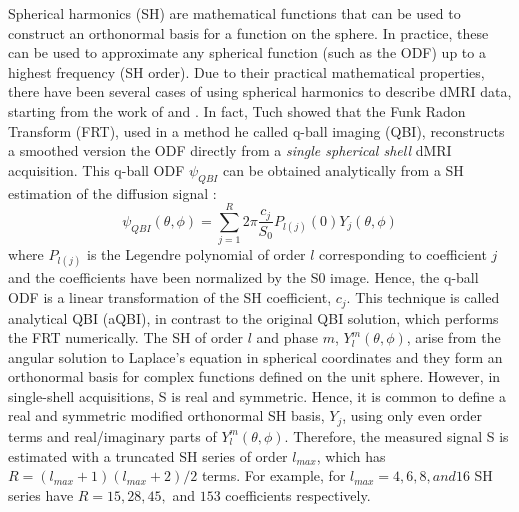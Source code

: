 \documentclass{bioinfo}
\begin{document}
Spherical harmonics (SH) are mathematical functions that can be used to construct an orthonormal basis for a function on the sphere. In practice, these can be used to approximate any spherical function (such as the ODF) up to a highest frequency (SH order). Due to their practical mathematical properties, there have been several cases of using spherical harmonics to describe dMRI data, starting from the work of \citet{Frank2001, Frank2002} and \citet{tuch-reese-etal:02}. In fact, Tuch showed that the Funk Radon Transform (FRT), used in a method he called q-ball imaging (QBI), reconstructs a smoothed version the ODF directly from a \emph{single spherical shell} dMRI acquisition. This q-ball ODF $\psi_{QBI}$ can be obtained analytically from a SH estimation of the diffusion signal \citep{descoteaux-angelino-etal:07, hess-mukherjee-etal:06, anderson:05}:
\begin{equation}\label{eq.qball}
\psi_{QBI}(\theta, \phi) = \sum_{j=1}^{R} 2\pi \frac{c_j}{S_0} P_{l(j)} (0) Y_{j} (\theta, \phi)
\end{equation}
where $P_{l(j)}$ is the Legendre polynomial of order $l$ corresponding to coefficient $j$ and the coefficients have been normalized by the S0 image. Hence, the q-ball ODF is a linear transformation of the SH coefficient, $c_j$. This technique is called analytical QBI (aQBI), in contrast to the original QBI solution, which performs the FRT numerically.
The SH of order $l$ and phase $m$, $Y_{l}^{m}(\theta, \phi)$, arise from the angular solution to Laplace’s equation in spherical coordinates and they form an orthonormal basis for
complex functions defined on the unit sphere. However, in single-shell acquisitions, S is real and symmetric. Hence, it is common to define a real and symmetric modified orthonormal SH basis, $Y_{j}$, using only even order terms and real/imaginary parts of $Y_{l}^{m}(\theta, \phi)$. Therefore, the measured signal S is estimated with a truncated SH series of order $l_{max}$, which has $R = (l_{max} +1)( l_{max} +2)/2$ terms. For example, for $l_{max} = 4, 6, 8, and 16$ SH series have $R = 15, 28, 45,$ and $153$ coefficients respectively.
\end{document}
